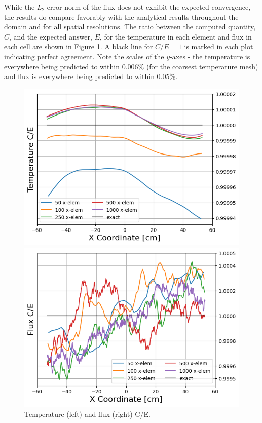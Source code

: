 \documentclass[letterpaper]{mc2023}
\begin{document}
While the $L_2$ error norm of the flux does not exhibit the expected convergence, the results do compare favorably with the analytical results
throughout the domain and for all spatial resolutions. The ratio between the computed quantity, $C$, and the expected answer, $E$, for the
temperature in each element and flux in each cell are shown in Figure \ref{fig:ce}. A black line for $C/E = 1$ is marked in each plot indicating
perfect agreement. Note the scales of the $y$-axes - the temperature is everywhere being predicted to within 0.006\% (for the coarsest temperature
mesh) and flux is everywhere being predicted to within 0.05\%.
\begin{figure}[H]
    \centering
    \begin{minipage}[b]{0.485\linewidth}
        \includegraphics[width=\linewidth]{figures/temp_num_to_analy_ratios.png}
    \end{minipage}
    \begin{minipage}[b]{0.485\linewidth}
        \includegraphics[width=\linewidth]{figures/flux_num_to_analy_ratios.png}
    \end{minipage}
    \caption{Temperature (left) and flux (right) C/E.}
    \label{fig:ce}
\end{figure}
\end{document}
